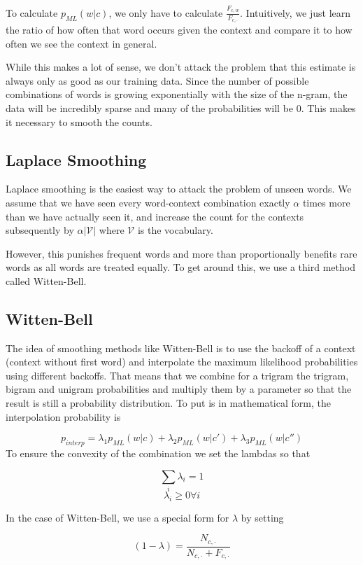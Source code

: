 \documentclass[11pt]{article}
\begin{document}
To calculate $p_{ML}(w|c)$, we only have to calculate $\frac{F_{c,w}}{F_{c,\cdot}}$. Intuitively, we just learn the ratio of how often that word occurs given the context and compare it to how often we see the context in general. 

While this makes a lot of sense, we don't attack the problem that this estimate is always only as good as our training data. Since the number of possible combinations of words is growing exponentially with the size of the n-gram, the data will be incredibly sparse and many of the probabilities will be 0. 
This makes it necessary to smooth the counts.

\subsection{Laplace Smoothing}

Laplace smoothing is the easiest way to attack the problem of unseen words. We assume that we have seen every word-context combination exactly $\alpha$ times more than we have actually seen it, and increase the count for the contexts subsequently by $\alpha |\mathcal{V}|$ where $\mathcal{V}$ is the vocabulary.

However, this punishes frequent words and more than proportionally benefits rare words as all words are treated equally. To get around this, we use a third method called Witten-Bell.

\subsection{Witten-Bell}

The idea of smoothing methods like Witten-Bell is to use the backoff of a context (context without first word) and interpolate the maximum likelihood probabilities using different backoffs. 
That means that we combine for a trigram the trigram, bigram and unigram probabilities and multiply them by a parameter so that the result is still a probability distribution. 
To put is in mathematical form, the interpolation probability is 

$$p_{interp} = \lambda_1p_{ML}(w|c) + \lambda_2p_{ML}(w|c') + \lambda_3p_{ML}(w|c'')$$
To ensure the convexity of the combination we set the lambdas so that

$$\sum_i\lambda_i=1$$
$$\lambda_i \geq 0 \forall i$$

In the case of Witten-Bell, we use a special form for $\lambda$ by setting 

$$(1-\lambda) = \frac{N_{c,\cdot}}{N_{c, \cdot}+F_{c,\cdot}}$$
\end{document}
